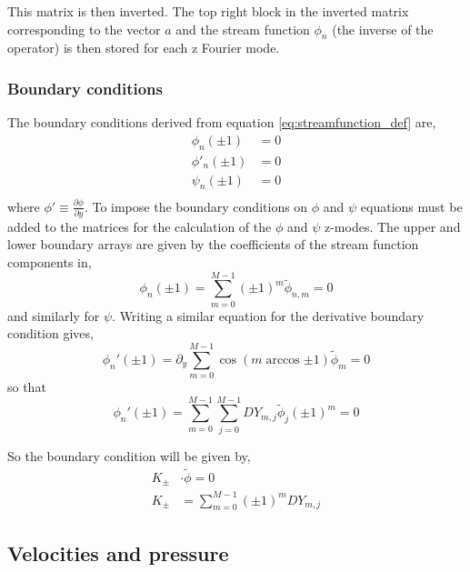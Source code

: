 \documentclass[12pt,a4paper]{article}
\newcommand{\dd}[1]{\partial_{#1}}
\begin{document}
This matrix is then inverted. The top right block in the inverted matrix corresponding to the vector $a$ and the stream function $\phi_{n}$ (the inverse of the operator) is then stored for each z Fourier mode. 

\subsubsection{Boundary conditions}

The boundary conditions derived from equation \ref{eq:streamfunction_def} are,
\begin{align}
     \phi_{n} \left( \pm 1 \right)  &= 0 \\ 
    \phi'_{n} \left( \pm 1 \right)  &= 0 \\
    \psi _{n} \left( \pm 1 \right)  &= 0 \\
\end{align}
where $\phi' \equiv \frac{\partial \phi}{ \partial y}$. To impose the boundary conditions on $\phi$ and $\psi$ equations must be added to the matrices for the calculation of the $\phi$ and $\psi$ z-modes. The upper and lower boundary arrays are given by the coefficients of the stream function components in,
\begin{equation}
    \phi_{n}(\pm 1) = \sum\limits_{m=0}^{M-1} (\pm1)^{m}\widetilde{\phi}_{n,m} = 0
\end{equation}
and similarly for $\psi$. Writing a similar equation for the derivative boundary condition gives,
\begin{equation}
    \phi_{n}'(\pm 1) = \dd{y} \sum\limits_{m=0}^{M-1} \cos{\left(m\arccos{\pm 1} \right)}\widetilde{\phi}_{m} = 0
\end{equation}
so that
\begin{equation}
    \phi_{n}'(\pm 1) = \sum\limits_{m=0}^{M-1} \sum\limits_{j=0}^{M-1} DY_{m,j}\widetilde{\phi}_{j} (\pm1)^{m} = 0
\end{equation}

So the boundary condition will be given by,
\begin{align}
    K_{\pm}& \cdot \widetilde{\phi} = 0 \\
    K_{\pm}& = \sum\limits_{m=0}^{M-1} (\pm1)^m DY_{m,j}  
\end{align}

\subsection{Velocities and pressure}
\end{document}
